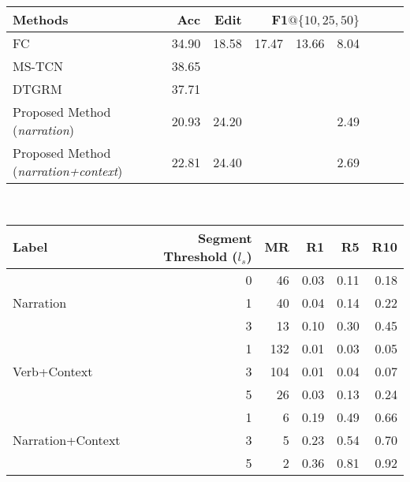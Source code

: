 \begin{table*}[h!]
\begin{minipage}[b]{1\textwidth}
\centering
\begin{tabular}{lrrrrrr}
\toprule
Methods  & Acc & Edit & F1$@\{10,25,50\}$ \\
\midrule
FC  & 34.90 & 18.58 & 17.47~~13.66~~8.04\\
MS-TCN \cite{8953830} & 38.65 & & \\
DTGRM \cite{wang2020temporal} & 37.71 & & \\
\midrule
Proposed Method (\textit{narration}) & 20.93 & 24.20 & 2.49 & \\
Proposed Method (\textit{narration+context})& 22.81 & 24.40 & 2.69 & \\
\bottomrule
\end{tabular}
\caption{Results of baseline models}
\label{table:results}
\end{minipage}
~\\
\begin{minipage}[b]{1\textwidth}
\centering
\begin{tabular}{lrrrrr}
\toprule
Label &  Segment Threshold ($l_s$) & MR & R1 & R5 & R10 \\
\midrule
\multirow{3}{*}{Narration} & 0 & 46 & 0.03 & 0.11 & 0.18 \\
 & 1 & 40 & 0.04 & 0.14 & 0.22 \\
 & 3 & 13 & 0.10 & 0.30 & 0.45 \\
\midrule
 & 1 & 132 & 0.01 & 0.03 & 0.05 \\
Verb+Context & 3 & 104 & 0.01 & 0.04 & 0.07 \\
 & 5 & 26 & 0.03 & 0.13 & 0.24\\
\midrule
 & 1 & 6 & 0.19 & 0.49 & 0.66 \\
Narration+Context & 3 & 5 & 0.23 & 0.54 & 0.70 \\
 & 5 & 2 & 0.36 & 0.81 & 0.92 \\
\bottomrule
\end{tabular}
\caption{Results of Video-Text Retrieval using different segment threshold}
\label{table:howto100m_seg_threshold}
\end{minipage}
~\\
\begin{minipage}[b]{1\textwidth}
\centering

\end{minipage}
\end{table*}
